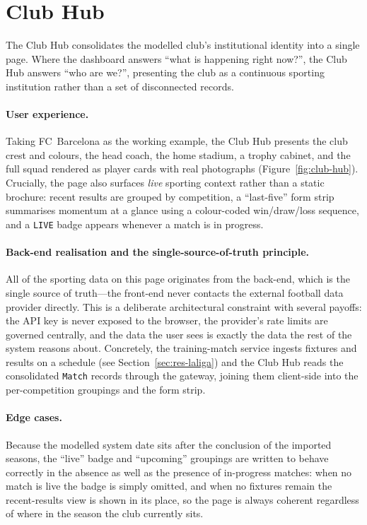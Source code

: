 \section{Club Hub}
\label{sec:res-clubhub}

The Club Hub consolidates the modelled club's institutional identity into a single page.
Where the dashboard answers ``what is happening right now?'', the Club Hub answers ``who
are we?'', presenting the club as a continuous sporting institution rather than a set of
disconnected records.

\paragraph{User experience.} Taking FC~Barcelona as the working example, the Club Hub
presents the club crest and colours, the head coach, the home stadium, a trophy cabinet,
and the full squad rendered as player cards with real photographs
(Figure~\ref{fig:club-hub}). Crucially, the page also surfaces \emph{live} sporting
context rather than a static brochure: recent results are grouped by competition, a
``last-five'' form strip summarises momentum at a glance using a colour-coded
win/draw/loss sequence, and a \texttt{LIVE} badge appears whenever a match is in
progress.

\paragraph{Back-end realisation and the single-source-of-truth principle.} All of the
sporting data on this page originates from the back-end, which is the single source of
truth---the front-end never contacts the external football data provider directly. This
is a deliberate architectural constraint with several payoffs: the API key is never
exposed to the browser, the provider's rate limits are governed centrally, and the data
the user sees is exactly the data the rest of the system reasons about. Concretely, the
training-match service ingests fixtures and results on a schedule (see
Section~\ref{sec:res-laliga}) and the Club Hub reads the consolidated \texttt{Match}
records through the gateway, joining them client-side into the per-competition groupings
and the form strip.

\paragraph{Edge cases.} Because the modelled system date sits after the conclusion of
the imported seasons, the ``live'' badge and ``upcoming'' groupings are written to behave
correctly in the absence as well as the presence of in-progress matches: when no match is
live the badge is simply omitted, and when no fixtures remain the recent-results view is
shown in its place, so the page is always coherent regardless of where in the season the
club currently sits.

